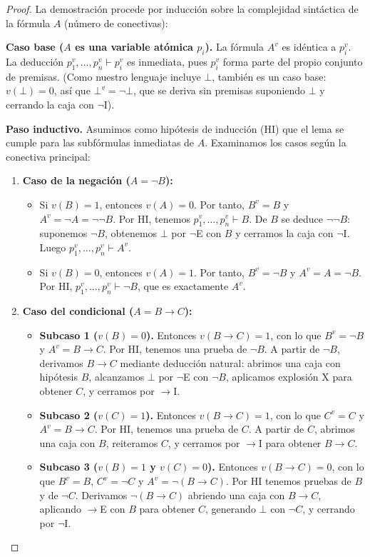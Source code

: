 \begin{proof}
La demostración procede por inducción sobre la complejidad sintáctica de la fórmula $A$ (número de conectivas):

\textbf{Caso base ($A$ es una variable atómica $p_i$).}  
La fórmula $A^v$ es idéntica a $p_i^v$. La deducción $p_1^v, \dots, p_n^v \vdash p_i^v$ es inmediata, pues $p_i^v$ forma parte del propio conjunto de premisas. (Como nuestro lenguaje incluye $\bot$, también es un caso base: $v(\bot) = 0$, así que $\bot^v = \neg\bot$, que se deriva sin premisas suponiendo $\bot$ y cerrando la caja con $\neg$I).


\textbf{Paso inductivo.} Asumimos como hipótesis de inducción (HI) que el lema se cumple para las subfórmulas inmediatas de $A$. Examinamos los casos según la conectiva principal:

\begin{enumerate}
    \item \textbf{Caso de la negación ($A = \neg B$):}
    \begin{itemize}
        \item Si $v(B) = 1$, entonces $v(A) = 0$. Por tanto, $B^v = B$ y $A^v = \neg A = \neg\neg B$. Por HI, tenemos $p_1^v, \dots, p_n^v \vdash B$. De $B$ se deduce $\neg\neg B$: suponemos $\neg B$, obtenemos $\bot$ por $\neg$E con $B$ y cerramos la caja con $\neg$I. Luego $p_1^v, \dots, p_n^v \vdash A^v$.
        \item Si $v(B) = 0$, entonces $v(A) = 1$. Por tanto, $B^v = \neg B$ y $A^v = A = \neg B$. Por HI, $p_1^v, \dots, p_n^v \vdash \neg B$, que es exactamente $A^v$.
    \end{itemize}

    \item \textbf{Caso del condicional ($A = B \to C$):}
    \begin{itemize}
        \item \textbf{Subcaso 1 ($v(B) = 0$).} Entonces $v(B \to C) = 1$, con lo que $B^v = \neg B$ y $A^v = B \to C$. Por HI, tenemos una prueba de $\neg B$. A partir de $\neg B$, derivamos $B \to C$ mediante deducción natural: abrimos una caja con hipótesis $B$, alcanzamos $\bot$ por $\neg$E con $\neg B$, aplicamos explosión $\text{X}$ para obtener $C$, y cerramos por $\to$I.
        \item \textbf{Subcaso 2 ($v(C) = 1$).} Entonces $v(B \to C) = 1$, con lo que $C^v = C$ y $A^v = B \to C$. Por HI, tenemos una prueba de $C$. A partir de $C$, abrimos una caja con $B$, reiteramos $C$, y cerramos por $\to$I para obtener $B \to C$.
        \item \textbf{Subcaso 3 ($v(B) = 1$ y $v(C) = 0$).} Entonces $v(B \to C) = 0$, con lo que $B^v = B$, $C^v = \neg C$ y $A^v = \neg(B \to C)$. Por HI tenemos pruebas de $B$ y de $\neg C$. Derivamos $\neg(B \to C)$ abriendo una caja con $B \to C$, aplicando $\to$E con $B$ para obtener $C$, generando $\bot$ con $\neg C$, y cerrando por $\neg$I.
    \end{itemize}


\end{enumerate}
\end{proof}
